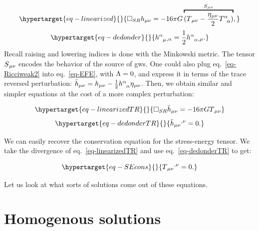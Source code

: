 \documentclass[
  11pt,
  a4paper,
  DIV=11,
  numbers=noendperiod,
  twoside]{scrreprt}
\DeclareRobustCommand{\[}{\begin{equation}}
\DeclareRobustCommand{\]}{\end{equation}}
\begin{document}
\begin{equation}\protect\hypertarget{eq-linearized}{}{
\square_{SR} \weakmet = -16\pi \grav \overbracket{(\SEco-\frac{\mink}{2}\trSE)}^{\srcco} ,
}\label{eq-linearized}\end{equation}
\begin{equation}\protect\hypertarget{eq-dedonder}{}{
\ipdv{\mixweakmet[\ind{\alpha}{\mu}]}{\alpha}=\frac{1}{2}\ipdv{\trweakmet}{\mu}. 
}\label{eq-dedonder}\end{equation} Recall raising and lowering indices
is done with the Minkowski metric. The tensor \(S{}_{\mu\nu}\) encodes the
behavior of the source of \glspl{gw}. One could also plug
eq.~\ref{eq-Ricciweak2} into eq.~\ref{eq-EFE}, with \(\Lambda=0\), and
express it in terms of the trace reversed perturbation:
\(\weakTRmet=\weakmet - \frac{1}{2}\trweakmet\mink\). Then, we obtain
similar and simpler equations at the cost of a more complex
perturbation: 

\begin{equation}\protect\hypertarget{eq-linearizedTR}{}{
\square_{SR} \weakTRmet = -16\pi \grav \SEco
}\label{eq-linearizedTR}\end{equation}
\begin{equation}\protect\hypertarget{eq-dedonderTR}{}{
    \ipdv[^]{\weakTRmet}{\nu}=0. 
}\label{eq-dedonderTR}\end{equation}

We can easily recover the conservation equation for the stress-energy
tensor. We take the divergence of eq.~\ref{eq-linearizedTR} and use
eq.~\ref{eq-dedonderTR} to get:

\begin{equation}\protect\hypertarget{eq-SEcons}{}{
    \ipdv[^]{\SEco}{\nu}=0.
}\label{eq-SEcons}\end{equation}

Let us look at what sorts of solutions come out of these equations.

\hypertarget{homogenous-solutions}{%
\section{Homogenous solutions}\label{homogenous-solutions}}
\end{document}
